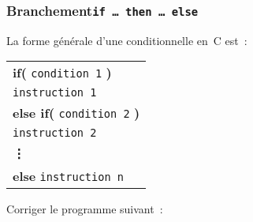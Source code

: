 \subsubsection{Branchement\qquad \texttt{if \dots\ then \dots\ else}}
\label{sec:BranchementIfThenElse}
La forme g\'en\'erale d'une conditionnelle en~C est~:
\par
\begin{center}
  \begin{tabular}{l}
    \textbf{if(} \texttt{condition 1} \textbf{)}\\
    \qquad \texttt{instruction 1} \\
    \textbf{else if(} \texttt{condition 2} \textbf{)}\\
    \qquad \texttt{instruction 2} \\
    \textbf{\vdots} \\
    \textbf{else} \texttt{instruction n} \\
  \end{tabular}
\end{center}
\begin{exercice}
  Corriger le programme suivant~:
  
\end{exercice}
